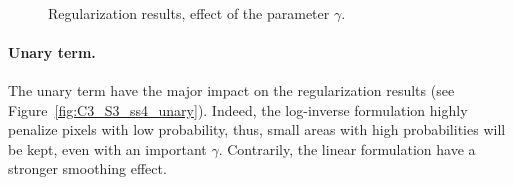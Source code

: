 \begin{figure}[htbp]
\begin{center}
{\label{subfig:C3_S3_ss4_gammad}
}
\\
\hspace*{0.025\textwidth}
\endgroup
\caption{Regularization results, effect of the parameter $\gamma$.}
\label{fig:C3_S3_ss4_gamma}
\end{center}
\end{figure}

\paragraph{Unary term. \\}

The unary term have the major impact on the regularization results (see Figure~\ref{fig:C3_S3_ss4_unary}). Indeed, the log-inverse formulation highly penalize pixels with low probability, thus, small areas with high probabilities will be kept, even with an important $\gamma$. Contrarily, the linear formulation have a stronger smoothing effect.

